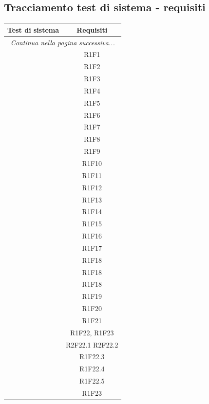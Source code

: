 \subsection{Tracciamento test di sistema - requisiti}

\resetCTS
\begin{center}
	\begin{longtable}{|c|c|}
	\hline
	\rowcolor{lighter-grayer}
	\textbf{Test di sistema} & \textbf{Requisiti} \\
	\hline
	\endfirsthead
	\hline
	\multicolumn{2}{|c|}{\textit{Continua nella pagina successiva...}} \\
	\hline
	\endfoot
	\endlastfoot

	\hline
	 & R1F1 \\
	 & R1F2 \\
	 & R1F3 \\
	 & R1F4 \\
	 & R1F5 \\
	 & R1F6 \\
	 & R1F7 \\
	 & R1F8 \\
	 & R1F9 \\
	 & R1F10 \\

	 & R1F11  \\
	 & R1F12 \\
	 & R1F13 \\
	 & R1F14 \\
	 & R1F15 \\
	 & R1F16 \\
	 & R1F17 \\
	 & R1F18 \\
	 & R1F18 \\
	 & R1F18 \\

	 & R1F19 \\
	 & R1F20 \\
	 & R1F21 \\
	 & R1F22, R1F23 \\
	 & R2F22.1 R2F22.2 \\
	 & R1F22.3 \\
	 & R1F22.4 \\
	 & R1F22.5 \\
	 & R1F23 \\
	\hline

	\end{longtable}
\end{center}



